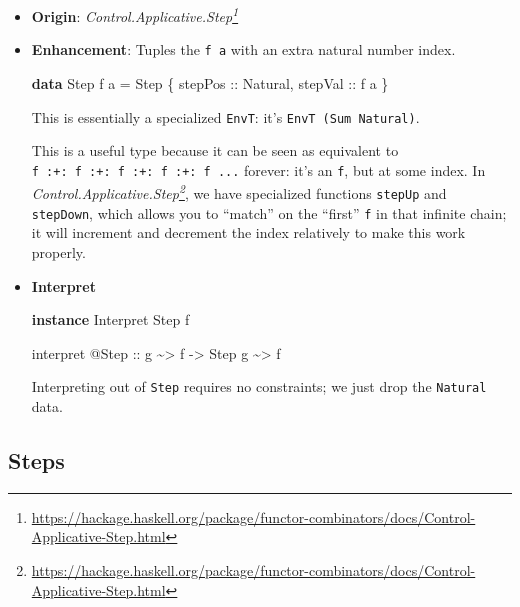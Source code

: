 \documentclass[]{article}
\newenvironment{Shaded}{}{}
\newcommand{\DataTypeTok}[1]{\textcolor[rgb]{0.56,0.13,0.00}{#1}}
\newcommand{\KeywordTok}[1]{\textcolor[rgb]{0.00,0.44,0.13}{\textbf{#1}}}
\newcommand{\NormalTok}[1]{#1}
\newcommand{\OperatorTok}[1]{\textcolor[rgb]{0.40,0.40,0.40}{#1}}
\newcommand{\OtherTok}[1]{\textcolor[rgb]{0.00,0.44,0.13}{#1}}
\renewcommand{\href}[2]{#2\footnote{\url{#1}}}
\begin{document}
\begin{itemize}
\item
  \textbf{Origin}:
  \emph{\href{https://hackage.haskell.org/package/functor-combinators/docs/Control-Applicative-Step.html}{Control.Applicative.Step}}
\item
  \textbf{Enhancement}: Tuples the \texttt{f\ a} with an extra natural number
  index.

\begin{Shaded}
\begin{Highlighting}[]
\KeywordTok{data} \DataTypeTok{Step}\NormalTok{ f a }\OtherTok{=} \DataTypeTok{Step}\NormalTok{ \{}\OtherTok{ stepPos ::} \DataTypeTok{Natural}\NormalTok{,}\OtherTok{ stepVal ::}\NormalTok{ f a \}}
\end{Highlighting}
\end{Shaded}

  This is essentially a specialized \texttt{EnvT}: it's
  \texttt{EnvT\ (Sum\ Natural)}.

  This is a useful type because it can be seen as equivalent to
  \texttt{f\ :+:\ f\ :+:\ f\ :+:\ f\ :+:\ f\ ...} forever: it's an \texttt{f},
  but at some index. In
  \emph{\href{https://hackage.haskell.org/package/functor-combinators/docs/Control-Applicative-Step.html}{Control.Applicative.Step}},
  we have specialized functions \texttt{stepUp} and \texttt{stepDown}, which
  allows you to ``match'' on the ``first'' \texttt{f} in that infinite chain; it
  will increment and decrement the index relatively to make this work properly.
\item
  \textbf{Interpret}

\begin{Shaded}
\begin{Highlighting}[]
\KeywordTok{instance} \DataTypeTok{Interpret} \DataTypeTok{Step}\NormalTok{ f}

\NormalTok{interpret }\OperatorTok{@}\DataTypeTok{Step}
\OtherTok{    ::}\NormalTok{ g }\OperatorTok{\textasciitilde{}\textgreater{}}\NormalTok{ f}
    \OtherTok{{-}\textgreater{}} \DataTypeTok{Step}\NormalTok{ g }\OperatorTok{\textasciitilde{}\textgreater{}}\NormalTok{ f}
\end{Highlighting}
\end{Shaded}

  Interpreting out of \texttt{Step} requires no constraints; we just drop the
  \texttt{Natural} data.
\end{itemize}

\subsection{Steps}\label{steps}
\end{document}
